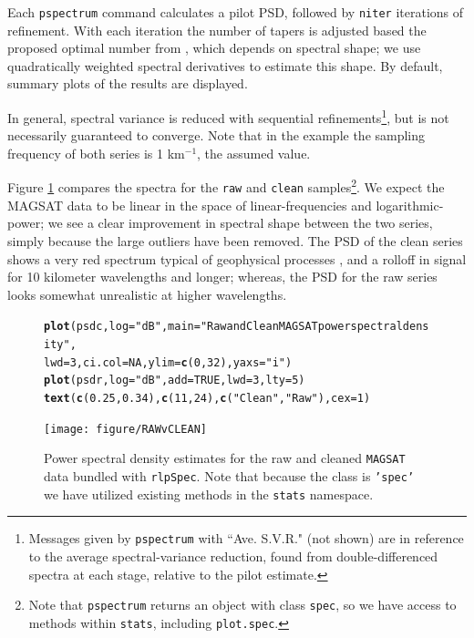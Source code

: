 \documentclass{article}\usepackage{graphicx, color}
\makeatletter
\newcommand{\hlfunctioncall}[1]{\textcolor[rgb]{0.501960784313725,0,0.329411764705882}{\textbf{#1}}}%
\newcommand{\hlstring}[1]{\textcolor[rgb]{0.6,0.6,1}{#1}}%
\newenvironment{kframe}{%
 \def\at@end@of@kframe{}%
 \ifinner\ifhmode%
  \def\at@end@of@kframe{\end{minipage}}%
  \begin{minipage}{\columnwidth}%
 \fi\fi%
 \def\FrameCommand##1{\hskip\@totalleftmargin \hskip-\fboxsep
 \colorbox{shadecolor}{##1}\hskip-\fboxsep
     \hskip-\linewidth \hskip-\@totalleftmargin \hskip\columnwidth}%
 \MakeFramed {\advance\hsize-\width
   \@totalleftmargin\z@ \linewidth\hsize
   \@setminipage}}%
 {\par\unskip\endMakeFramed%
 \at@end@of@kframe}
\newenvironment{knitrout}{}{} %
\newcommand{\Rcmd}[1]{\texttt{#1}}
\newcommand{\rlp}[0]{\Rcmd{rlpSpec}}
\makeatother
\begin{document}
Each  \Rcmd{pspectrum} command calculates a pilot PSD, followed by 
\Rcmd{niter}
iterations of refinement.
With each iteration
the number of tapers is adjusted 
based the proposed optimal number from \citet{rs1995}, which
depends on spectral shape; we use 
quadratically weighted spectral derivatives to estimate this shape.
By default, summary plots of the results are displayed.

In general, spectral variance is reduced
with sequential refinements\footnote{
Messages given by \Rcmd{pspectrum} with
``Ave. S.V.R."  (not shown)
are in reference to the 
 average spectral-variance reduction, found from
 double-differenced spectra at each stage, relative
 to the pilot estimate.
}, but is not necessarily guaranteed to converge.
Note that in the example
the sampling frequency of both series
is 1 km$^{-1}$, the assumed value.

Figure \ref{fig:pmag} compares the spectra for the \Rcmd{raw} and \Rcmd{clean} 
samples\footnote{
Note that \Rcmd{pspectrum} returns
an object with class \Rcmd{spec}, so we have access to methods 
within \Rcmd{stats}, including \Rcmd{plot.spec}.
}.  
We expect the MAGSAT data to be linear in the space of
linear-frequencies and logarithmic-power;
we see a clear
improvement in spectral shape between the two series,
simply because the large outliers have been removed.
The PSD of the clean series shows a
very red spectrum typical of geophysical processes \citep{agnew1992},
and
a rolloff in signal
for 10 kilometer wavelengths and longer; whereas, the 
PSD for the raw series looks somewhat unrealistic at higher wavelengths.
%
\begin{figure}[htb!]
\begin{center}
\begin{knitrout}
\color{fgcolor}\begin{kframe}
\begin{alltt}
\hlfunctioncall{plot}(psdc, log = \hlstring{"dB"}, main = \hlstring{"Raw and Clean MAGSAT power spectral density"}, 
    lwd = 3, ci.col = NA, ylim = \hlfunctioncall{c}(0, 32), yaxs = \hlstring{"i"})
\hlfunctioncall{plot}(psdr, log = \hlstring{"dB"}, add = TRUE, lwd = 3, lty = 5)
\hlfunctioncall{text}(\hlfunctioncall{c}(0.25, 0.34), \hlfunctioncall{c}(11, 24), \hlfunctioncall{c}(\hlstring{"Clean"}, \hlstring{"Raw"}), cex = 1)
\end{alltt}
\end{kframe}
\texttt{[image: figure/RAWvCLEAN]} 

\end{knitrout}

\caption{Power spectral density estimates for the raw and cleaned
             \Rcmd{MAGSAT} data bundled with \rlp{}. Note that
             because the class is \Rcmd{'spec'} we have
             utilized  existing methods in the \Rcmd{stats} namespace.}
\label{fig:pmag}
\end{center}
\end{figure}
\end{document}
